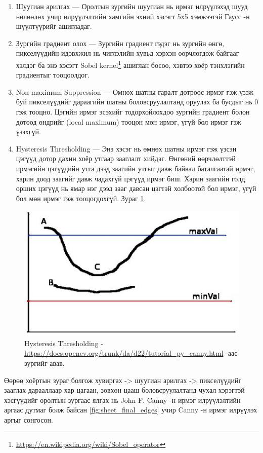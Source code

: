 \begin{enumerate}
	\item Шуугиан арилгах --- Оролтын зургийн шуугиан нь ирмэг илрүүлэхэд шууд нөлөөлөх учир илрүүлэлтийн хамгийн эхний хэсэгт 5х5 хэмжээтэй Гаусс -н шүүлтүүрийг ашигладаг.
	\item Зургийн градиент олох --- Зургийн градиент гэдэг нь зургийн өнгө, пикселүүдийн идэвхжил нь чиглэлийн хувьд хэрхэн өөрчлөгдөж байгааг хэлдэг ба энэ хэсэгт Sobel kernel\footnote{\url{https://en.wikipedia.org/wiki/Sobel_operator}} ашиглан босоо, хэвтээ хоёр тэнхлэгийн градиентыг тооцоолдог.
	\item Non-maximum Suppression --- Өмнөх шатны гаралт дотроос ирмэг гэж үзэж буй пикселүүдийг дараагийн шатны боловсруулалтанд оруулах ба бусдыг нь 0 гэж тооцно. Цэгийн ирмэг эсэхийг тодорхойлохдоо зургийн градиент болон дотоод өндрийг (local maximum) тооцон мөн ирмэг, үгүй бол ирмэг гэж үзэхгүй.
	\item Hysteresis Thresholding --- Энэ хэсэг нь өмнөх шатны ирмэг гэж үзсэн цэгүүд дотор дахин хоёр утгаар зааглалт хийдэг. Өнгөний өөрчлөлттэй ирмэгийн цэгүүдийн утга дээд заагийн утгыг давж байвал баталгаатай ирмэг, харин доод заагийг давж чадахгүй цэгүүд ирмэг биш. Харин заагийн голд орших цэгүүд нь ямар нэг дээд зааг давсан цэгтэй холбоотой бол ирмэг, үгүй бол мөн ирмэг гэж тооцогдохгүй. Зураг \ref{fig:hysteresis}.
\end{enumerate}

\begin{figure}[H]
	\centering
	\includegraphics[width=0.6\linewidth]{images/hysteresis}
	\caption{Hysteresis Thresholding - \url{https://docs.opencv.org/trunk/da/d22/tutorial_py_canny.html} -аас зургийг авав.}
	\label{fig:hysteresis}
\end{figure}

Өөрөө хоёртын зураг болгож хувиргах -> шуугиан арилгах -> пикселүүдийг зааглах дарааллаар хар цагаан, зөвхөн цааш боловсруулалтанд чухал хэрэгтэй хэсгүүдийг оролтын зургаас ялгах нь John F. Canny -н ирмэг илрүүлэлтийн аргаас дутмаг болж байсан \ref{fig:sheet_final_edges} учир Canny -н ирмэг илрүүлэх аргыг сонгосон.

